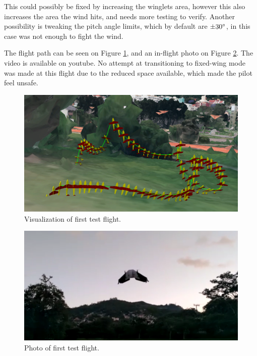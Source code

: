 This could possibly be fixed by increasing the winglets area, however this also increases the area the wind hits, and needs more testing to verify.
%
Another possibility is tweaking the pitch angle limits, which by default are $\pm 30\degree$, in this case was not enough to fight the wind.

The flight path can be seen on Figure \ref{fig:flight1-3d}, and an in-flight photo on Figure \ref{fig:flight1-photo}. The video is available on youtube\cite{flight1}.
%
No attempt at transitioning to fixed-wing mode was made at this flight due to the reduced space available, which made the pilot feel unsafe.
	

\begin{figure}[H]
\centering
  \includegraphics[width=0.7\linewidth]{figs/flight1-3d.png}
  \caption{Visualization of first test flight.}
  \label{fig:flight1-3d}
\end{figure}
	
	\begin{figure}[H]
\centering
  \includegraphics[width=0.7\linewidth]{figs/flight1-photo.png}
  \caption{Photo of first test flight.}
  \label{fig:flight1-photo}
\end{figure}
	






